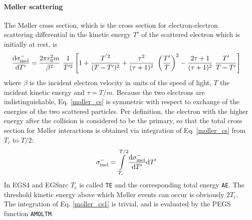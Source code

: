 \paragraph{M{\o}ller scattering} \hfill
{}

The M{\o}ller cross section, which is the cross section 
for electron-electron scattering differential in the kinetic energy 
$T'$ of the scattered electron which is initially at rest, is
\cite{ICRU37} 
\begin{equation}
\label{moller_cs}
{{\rm d} \sigma_{\rm inel}^- \over  {\rm d}T'} = 
{2 \pi r_0^2 m \over \beta^2}~\frac{1}{T^{\prime 2}} \left[ 
1 + {T^{' 2} \over (T - T')^2} + {\tau^2 \over (\tau+1)^2}~
\left(\frac{T'}{T}\right)^2 
- {2 \tau + 1 \over (\tau + 1)^2}~{T' \over T - T'} \right]
\end{equation}
where $\beta$ is the incident electron velocity in units of the 
speed of light, $T$ the incident kinetic energy and $\tau = T/m$. 
Because the two electrons are indistinguishable, Eq. \eqref{moller_cs} 
is symmetric with respect to exchange of the energies of the two scattered 
particles. Per definition, the electron with the higher energy 
after the collision is considered to be the primary, so that 
the total cross section for M{\o}ller interactions is obtained 
via integration of Eq. \eqref{moller_cs} from $T_c$ to $T/2$:
\begin{equation}
\label{moller_cs1}
\sigma_{\rm inel}^- = \int\limits_{T_c}^{T/2} 
{{\rm d} \sigma_{\rm inel}^- \over  {\rm d}T'} {\rm d}T' 
\end{equation}
In EGS4 and EGSnrc $T_c$ is called {\tt TE} and the corresponding 
total energy {\tt AE}. The threshold kinetic energy above which M{\o}ller
events can occur is obviously $2 T_c$. The integration of 
Eq. \eqref{moller_cs1} is trivial, and is evaluated by the 
PEGS function {\tt AMOLTM}. 

